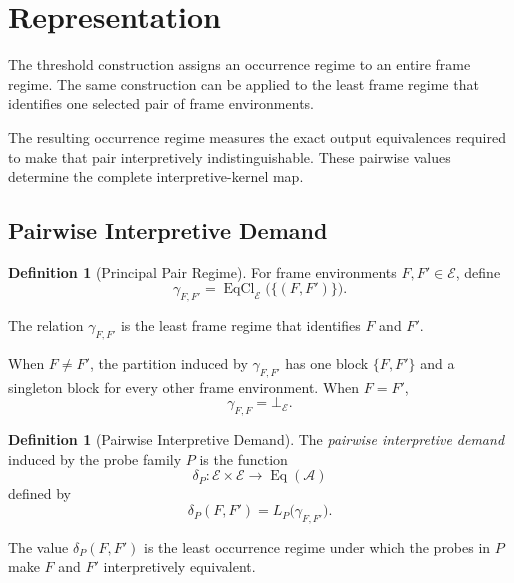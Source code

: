 \documentclass[11pt]{article}
\theoremstyle{plain}
\theoremstyle{definition}
\newtheorem{definition}[theorem]{Definition}
\theoremstyle{remark}
\begin{document}
\section{Representation}
\label{ik.sec.representation}

The threshold construction assigns an occurrence regime
to an entire frame regime.
The same construction can be applied to the least frame regime
that identifies one selected pair of frame environments.

The resulting occurrence regime measures
the exact output equivalences required
to make that pair interpretively indistinguishable.
These pairwise values determine the complete interpretive-kernel map.

\subsection{Pairwise Interpretive Demand}

\begin{definition}[Principal Pair Regime]
  \label{ik.def.principal-pair}
  For frame environments
  \(F,F'\in\mathcal{E}\),
  define
  \[
    \gamma_{F,F'}
    =
    \operatorname{EqCl}_{\mathcal{E}}
    \bigl(
    \{
    (F,F')
    \}
    \bigr).
  \]

  The relation \(\gamma_{F,F'}\)
  is the least frame regime
  that identifies \(F\) and \(F'\).
\end{definition}

When \(F\neq F'\),
the partition induced by \(\gamma_{F,F'}\)
has one block \(\{F,F'\}\)
and a singleton block for every other frame environment.
When \(F=F'\),
\[
  \gamma_{F,F}
  =
  \bot_{\mathcal{E}}.
\]

\begin{definition}[Pairwise Interpretive Demand]
  \label{ik.def.pairwise-demand}
  The \emph{pairwise interpretive demand}
  induced by the probe family \(P\) is the function
  \[
    \delta_P:
    \mathcal{E}\times\mathcal{E}
    \longrightarrow
    \operatorname{Eq}(\mathcal{A})
  \]
  defined by
  \[
    \delta_P(F,F')
    =
    L_P
    \bigl(
    \gamma_{F,F'}
    \bigr).
  \]
\end{definition}

The value \(\delta_P(F,F')\)
is the least occurrence regime
under which the probes in \(P\)
make \(F\) and \(F'\) interpretively equivalent.
\end{document}
